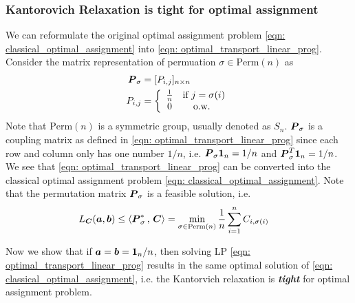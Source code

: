\documentclass[11pt]{article}
\begin{document}
\subsubsection{Kantorovich Relaxation is tight for optimal assignment}\label{sec: discrete_tight}
We can reformulate the original optimal assignment problem \eqref{eqn: classical_optimal_assignment} into \eqref{eqn: optimal_transport_linear_prog}. Consider the matrix representation of permuation $\sigma \in  \text{Perm}(n)$ as
\begin{align*}
\boldsymbol{P}_{\sigma} &= [ P_{i,j}]_{n \times n} \\
P_{i,j} &=  \left\{\begin{array}{cc}
 \frac{1}{n} & \text{if } j = \sigma(i) \\ 
 0 & \text{o.w. }
\end{array}\right.
\end{align*} Note that $\text{Perm}(n)$ is a symmetric group, usually denoted as $S_{n}.$ $\boldsymbol{P}_{\sigma}$ is a coupling matrix as defined in \eqref{eqn: optimal_transport_linear_prog} since each row and column only has one number $1/n$, i.e. $\boldsymbol{P}_{\sigma}\boldsymbol{1}_{n} = 1/n$ and $\boldsymbol{P}_{\sigma}^{T}\boldsymbol{1}_{n} = 1/n$. We see that \eqref{eqn: optimal_transport_linear_prog} can be converted into the classical optimal assignment problem \eqref{eqn: classical_optimal_assignment}. Note that the permutation matrix $\boldsymbol{P}_{\sigma}$ is a feasible solution,  i.e. 
\begin{align*}
L_{\boldsymbol{C}}(\boldsymbol{a}, \boldsymbol{b}) &\le \left\langle \boldsymbol{P}_{\sigma}^{*}\,,\, \boldsymbol{C} \right\rangle =\min_{\sigma \in \text{Perm}(n)} \frac{1}{n}\sum_{i=1}^{n} C_{i, \sigma(i)}
\end{align*} 

Now we show that if $\boldsymbol{a} = \boldsymbol{b} = \boldsymbol{1}_{n}/n$, then solving LP \eqref{eqn: optimal_transport_linear_prog} results in the same optimal solution of \eqref{eqn: classical_optimal_assignment},  i.e. the Kantorvich relaxation is \emph{\textbf{tight}} for optimal assignment problem. 
\end{document}
